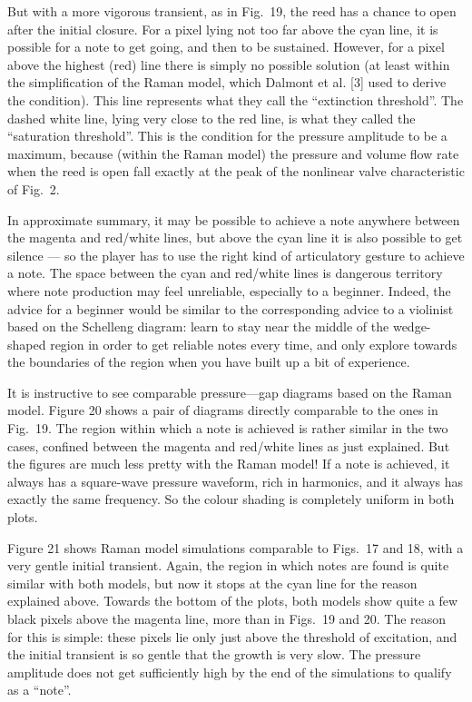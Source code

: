   But with a more vigorous transient, as in Fig.\ 19, the reed has a chance to 
  open after the initial closure. For a pixel lying not too far above the cyan 
  line, it is possible for a note to get going, and then to be sustained. 
  However, for a pixel above the highest (red) line there is simply no possible 
  solution (at least within the simplification of the Raman model, which 
  Dalmont et al. [3] used to derive the condition). This line represents what 
  they call the “extinction threshold”. The dashed white line, lying very close 
  to the red line, is what they called the ``saturation threshold''. This is 
  the condition for the pressure amplitude to be a maximum, because (within the 
  Raman model) the pressure and volume flow rate when the reed is open fall 
  exactly at the peak of the nonlinear valve characteristic of Fig.\ 2. 

  In approximate summary, it may be possible to achieve a note anywhere between 
  the magenta and red/white lines, but above the cyan line it is also possible 
  to get silence — so the player has to use the right kind of articulatory 
  gesture to achieve a note. The space between the cyan and red/white lines is 
  dangerous territory where note production may feel unreliable, especially to 
  a beginner. Indeed, the advice for a beginner would be similar to the 
  corresponding advice to a violinist based on the Schelleng diagram: learn to 
  stay near the middle of the wedge-shaped region in order to get reliable 
  notes every time, and only explore towards the boundaries of the region when 
  you have built up a bit of experience. 

  It is instructive to see comparable pressure—gap diagrams based on the Raman 
  model. Figure 20 shows a pair of diagrams directly comparable to the ones in 
  Fig.\ 19. The region within which a note is achieved is rather similar in the 
  two cases, confined between the magenta and red/white lines as just 
  explained. But the figures are much less pretty with the Raman model! If a 
  note is achieved, it always has a square-wave pressure waveform, rich in 
  harmonics, and it always has exactly the same frequency. So the colour 
  shading is completely uniform in both plots. 

  Figure 21 shows Raman model simulations comparable to Figs.\ 17 and 18, with 
  a very gentle initial transient. Again, the region in which notes are found 
  is quite similar with both models, but now it stops at the cyan line for the 
  reason explained above. Towards the bottom of the plots, both models show 
  quite a few black pixels above the magenta line, more than in Figs.\ 19 and 
  20. The reason for this is simple: these pixels lie only just above the 
  threshold of excitation, and the initial transient is so gentle that the 
  growth is very slow. The pressure amplitude does not get sufficiently high by 
  the end of the simulations to qualify as a “note”. 

